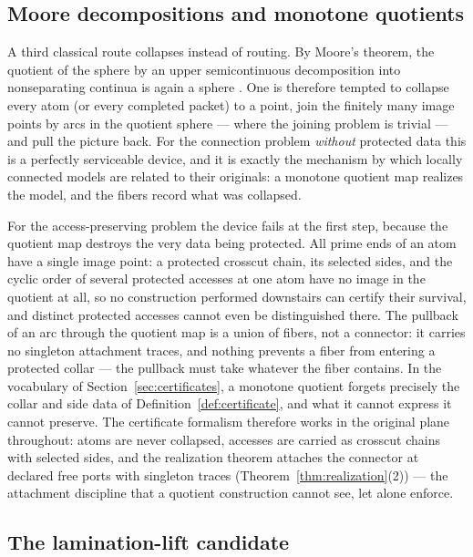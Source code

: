 \documentclass[11pt,reqno]{amsart}
\theoremstyle{definition}
\theoremstyle{remark}
\begin{document}
\subsection{Moore decompositions and monotone quotients}
\label{subsec:A-comp-moore}

A third classical route collapses instead of routing.  By Moore's
theorem, the quotient of the sphere by an upper semicontinuous
decomposition into nonseparating continua is again a sphere
\cite{Moo25}.  One is therefore tempted to collapse every atom (or every
completed packet) to a point, join the finitely many image points by
arcs in the quotient sphere --- where the joining problem is trivial ---
and pull the picture back.  For the connection problem \emph{without}
protected data this is a perfectly serviceable device, and it is exactly
the mechanism by which locally connected models are related to their
originals: a monotone quotient map realizes the model, and the fibers
record what was collapsed.

For the access-preserving problem the device fails at the first step,
because the quotient map destroys the very data being protected.  All
prime ends of an atom have a single image point: a protected crosscut
chain, its selected sides, and the cyclic order of several protected
accesses at one atom have no image in the quotient at all, so no
construction performed downstairs can certify their survival, and
distinct protected accesses cannot even be distinguished there.  The
pullback of an arc through the quotient map is a union of fibers, not a
connector: it carries no singleton attachment traces, and nothing
prevents a fiber from entering a protected collar --- the pullback must
take whatever the fiber contains.  In the vocabulary of
Section~\ref{sec:certificates}, a monotone quotient forgets precisely
the collar and side data of Definition~\ref{def:certificate}, and what
it cannot express it cannot preserve.  The certificate formalism
therefore works in the original plane throughout: atoms are never
collapsed, accesses are carried as crosscut chains with selected sides,
and the realization theorem attaches the connector at declared free
ports with singleton traces (Theorem~\ref{thm:realization}(2)) --- the
attachment discipline that a quotient construction cannot see, let alone
enforce.

\subsection{The lamination-lift candidate}
\label{subsec:A-comp-lamination}
\end{document}
